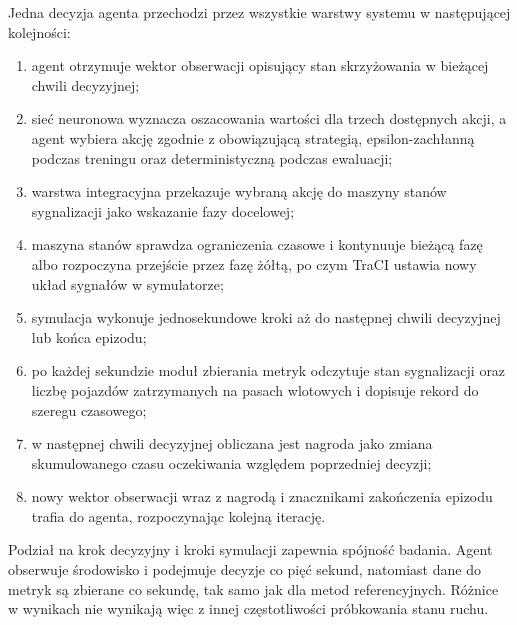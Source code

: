 Jedna decyzja agenta przechodzi przez wszystkie warstwy systemu w następującej kolejności:
\begin{enumerate}
    \item agent otrzymuje wektor obserwacji opisujący stan skrzyżowania w bieżącej chwili decyzyjnej;
    \item sieć neuronowa wyznacza oszacowania wartości dla trzech dostępnych akcji, a agent wybiera akcję zgodnie z obowiązującą strategią, epsilon-zachłanną podczas treningu oraz deterministyczną podczas ewaluacji;
    \item warstwa integracyjna przekazuje wybraną akcję do maszyny stanów sygnalizacji jako wskazanie fazy docelowej;
    \item maszyna stanów sprawdza ograniczenia czasowe i kontynuuje bieżącą fazę albo rozpoczyna przejście przez fazę żółtą, po czym TraCI ustawia nowy układ sygnałów w symulatorze;
    \item symulacja wykonuje jednosekundowe kroki aż do następnej chwili decyzyjnej lub końca epizodu;
    \item po każdej sekundzie moduł zbierania metryk odczytuje stan sygnalizacji oraz liczbę pojazdów zatrzymanych na pasach wlotowych i dopisuje rekord do szeregu czasowego;
    \item w następnej chwili decyzyjnej obliczana jest nagroda jako zmiana skumulowanego czasu oczekiwania względem poprzedniej decyzji;
    \item nowy wektor obserwacji wraz z nagrodą i znacznikami zakończenia epizodu trafia do agenta, rozpoczynając kolejną iterację.
\end{enumerate}

Podział na krok decyzyjny i kroki symulacji zapewnia spójność badania. Agent obserwuje środowisko i podejmuje decyzje co pięć sekund, natomiast dane do metryk są zbierane co sekundę, tak samo jak dla metod referencyjnych. Różnice w wynikach nie wynikają więc z innej częstotliwości próbkowania stanu ruchu.
